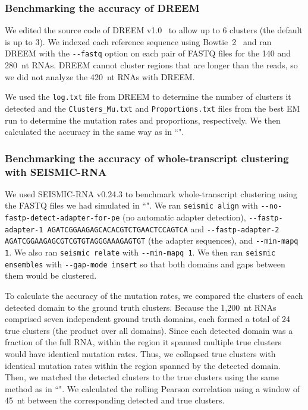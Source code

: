 \documentclass[11pt]{article}
\begin{document}
\subsubsection{Benchmarking the accuracy of DREEM}

We edited the source code of DREEM v1.0~\cite{Tomezsko2020} to allow up to 6 clusters (the default is up to 3).
We indexed each reference sequence using Bowtie~2~\cite{Langmead2012} and ran DREEM with the \verb|--fastq| option on each pair of FASTQ files for the 140 and 280~nt RNAs.
DREEM cannot cluster regions that are longer than the reads, so we did not analyze the 420~nt RNAs with DREEM.

We used the \verb|log.txt| file from DREEM to determine the number of clusters it detected and the \verb|Clusters_Mu.txt| and \verb|Proportions.txt| files from the best EM run to determine the mutation rates and proportions, respectively.
We then calculated the accuracy in the same way as in ``".

\subsubsection{Benchmarking the accuracy of whole-transcript clustering with SEISMIC-RNA}
\label{benchmark-whole-seismic-rna}

We used SEISMIC-RNA v0.24.3 to benchmark whole-transcript clustering using the FASTQ files we had simulated in ``".
We ran \verb|seismic align| with \verb|--no-fastp-detect-adapter-for-pe| (no automatic adapter detection), \verb|--fastp-adapter-1 AGATCGGAAGAGCACACGTCTGAACTCCAGTCA| and \verb|--fastp-adapter-2 AGATCGGAAGAGCGTCGTGTAGGGAAAGAGTGT| (the adapter sequences), and \verb|--min-mapq 1|.
We also ran \verb|seismic relate| with \verb|--min-mapq 1|.
We then ran \verb|seismic ensembles| with \verb|--gap-mode insert| so that both domains and gaps between them would be clustered.

To calculate the accuracy of the mutation rates, we compared the clusters of each detected domain to the ground truth clusters.
Because the 1,200~nt RNAs comprised seven independent ground truth domains, each formed a total of 24 true clusters (the product over all domains).
Since each detected domain was a fraction of the full RNA, within the region it spanned multiple true clusters would have identical mutation rates.
Thus, we collapsed true clusters with identical mutation rates within the region spanned by the detected domain.
Then, we matched the detected clusters to the true clusters using the same method as in ``".
We calculated the rolling Pearson correlation using a window of 45~nt between the corresponding detected and true clusters.
\end{document}
